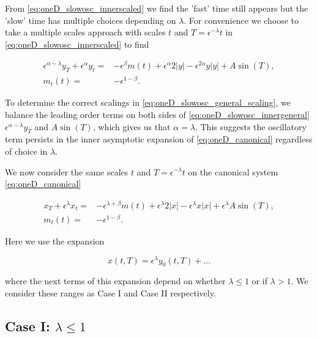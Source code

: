 From \eqref{eq:oneD_slowosc_innerscaled} we find the 'fast' time still appears but the 'slow' time has multiple choices depending on $\lambda$. For convenience we choose to take a multiple scales approach with scales $t$ and $T=\epsilon^{-\lambda}t$ in \eqref{eq:oneD_slowosc_innerscaled} to find

\begin{equation}\label{eq:oneD_slowosc_innergeneral}
\begin{aligned}
\epsilon^{\alpha-\lambda} y_T+\epsilon^{\alpha}y_t=& -\epsilon^{\beta}m(t)+\epsilon^{\alpha}2|y|-\epsilon^{2\alpha}y|y|+A\sin(T),\\
m_t(t)=&-\epsilon^{1-\beta}.
\end{aligned}
\end{equation}

To determine the correct scalings in \eqref{eq:oneD_slowosc_general_scaling}, we balance the leading order terms on both sides of \eqref{eq:oneD_slowosc_innergeneral} $\epsilon^{\alpha-\lambda}y_T$ and $A\sin(T)$, which gives us that $\alpha=\lambda$. This suggests the oscillatory term persists in the inner asymptotic expansion of \eqref{eq:oneD_canonical} regardless of choice in $\lambda$.

We now consider the same scales $t$ and $T=\epsilon^{-\lambda}t$ on the canonical system \eqref{eq:oneD_canonical} 

\begin{equation}\label{eq:oneD_slowosc_general_outermulti}
\begin{aligned}
x_T+\epsilon^{\lambda}x_t =& -\epsilon^{\lambda+\beta}m(t)+\epsilon^{\lambda}2|x|-\epsilon^{\lambda}x|x|+\epsilon^{\lambda}A\sin(T),\\
m_t(t) =&-\epsilon^{1-\beta}.
\end{aligned}
\end{equation}

Here we use the expansion 

\begin{equation*}
x(t,T) = \epsilon^{\lambda}y_0(t,T) +\ldots 
\end{equation*}

where the next terms of this expansion depend on whether $\lambda\le1$ or if $\lambda> 1$. We consider these ranges as Case I and Case II respectively.

\subsection{Case I: $\lambda \le 1$}
\label{subsec:oneD_slowosc_caseI}


